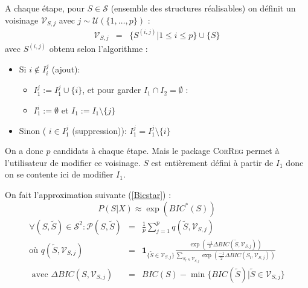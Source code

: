 \documentclass[12pt]{article}
\begin{document}
	
	A chaque étape, pour $S \in \mathcal{S}$ (ensemble des structures réalisables) on définit un voisinage $\mathcal{V}_{S,j}$ avec $j \sim \mathcal{U}(\{1,\dots,p\}) $ :%
	\begin{eqnarray}
		\mathcal{V}_{S,j}&=&\{ S^{(i,j)} | 1\leq i\leq p \} \cup\{S \}
	\end{eqnarray}	
	avec $S^{(i,j)}$ obtenu selon l'algorithme :
	\begin{itemize}
		\item Si $i \notin I_i^j$ (ajout): 
			\begin{itemize}
				\item $I_1^j :=I_1^j\cup \{i\}$, et pour garder $I_1\cap I_2=\emptyset$ :
				\item $I_1^i :=\emptyset$ et $I_1:=I_1 \setminus \{j\}$
			\end{itemize}			 
		\item Sinon ( $i \in I_1^j$ (suppression)): $I_1^j=I_1^j\setminus \{i\}$
	\end{itemize}
	On a donc $p$ candidats à chaque étape. Mais le package \textsc{CorReg} permet à l'utilisateur de modifier ce voisinage.
	$S$ est entièrement défini à partir de $I_1$ donc on se contente ici de modifier $I_1$. %
		
	On fait l'approximation suivante  (\ref{Bicstar}) : 
	\begin{equation}
		P(S|X)\approx \exp(BIC^*(S))
	\end{equation}
	\begin{eqnarray}
			\forall (S,\tilde{S}) \in \mathcal{S}^2 : \mathcal{P}(S,\tilde{S})&=& \frac{1}{p} \sum_{j=1}^p q(\tilde{S},\mathcal{V}_{S,j}) \\
	\textrm{où }	q(\tilde{S},\mathcal{V}_{S,j})&=&\mathbf{1}_{ \{\tilde{S}\in \mathcal{V}_{S,j}\} }\frac{\exp(\frac{-1}{2}\Delta BIC(\tilde{S},\mathcal{V}_{S,j}))}{\sum_{S_l\in \mathcal{V}_{S,j}}\exp(\frac{-1}{2}\Delta BIC(S_l,\mathcal{V}_{S,j}))} \\
	\textrm{ avec } \Delta BIC(S,\mathcal{V}_{S,j})&=&BIC(S)-\min\{BIC(\tilde{S})| \tilde{S} \in \mathcal{V}_{S,j} \}
	\end{eqnarray}
	
\end{document}
